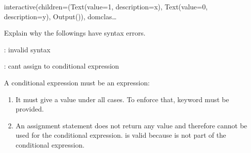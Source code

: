 \documentclass[letterpaper,10pt,english]{sphinxmanual}
\begin{document}
\begin{sphinxVerbatim}[commandchars=\\\{\}]
interactive(children=(Text(value=\PYGZsq{}1\PYGZsq{}, description=\PYGZsq{}x\PYGZsq{}), Text(value=\PYGZsq{}0\PYGZsq{}, description=\PYGZsq{}y\PYGZsq{}), Output()), \PYGZus{}dom\PYGZus{}clas…
\end{sphinxVerbatim}

 Explain why the followings have syntax errors.

\begin{sphinxVerbatim}[commandchars=\\\{\}]
  
\end{sphinxVerbatim}

\begin{sphinxVerbatim}[commandchars=\\\{\}]
  
: invalid syntax
\end{sphinxVerbatim}

\begin{sphinxVerbatim}[commandchars=\\\{\}]
         
\end{sphinxVerbatim}

\begin{sphinxVerbatim}[commandchars=\\\{\}]
            
: can\PYGZsq{}t assign to conditional expression
\end{sphinxVerbatim}

A conditional expression must be an expression:
\begin{enumerate}
%
\item {} 
It must give a value under all cases. To enforce that,  keyword must be provided.

\item {} 
An assignment statement does not return any value and therefore cannot be used for the conditional expression. is valid because  is not part of the conditional expression.

\end{enumerate}
\end{document}
